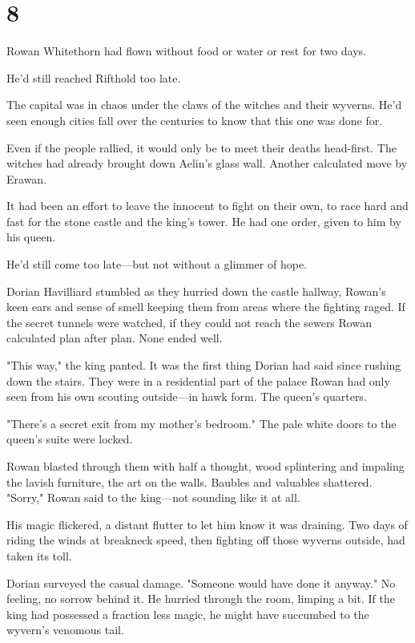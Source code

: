 
\chapter{8}

Rowan Whitethorn had flown without food or water or rest for two days.

He'd still reached Rifthold too late.

The capital was in chaos under the claws of the witches and their wyverns. He'd seen enough cities fall over the centuries to know that this one was done for.

Even if the people rallied, it would only be to meet their deaths head-first. The witches had already brought down Aelin's glass wall. Another calculated move by Erawan.

It had been an effort to leave the innocent to fight on their own, to race hard and fast for the stone castle and the king's tower. He had one order, given to him by his queen.

He'd still come too late---but not without a glimmer of hope.

Dorian Havilliard stumbled as they hurried down the castle hallway, Rowan's keen ears and sense of smell keeping them from areas where the fighting raged. If the secret tunnels were watched, if they could not reach the sewers  Rowan calculated plan after plan. None ended well.

"This way," the king panted. It was the first thing Dorian had said since rushing down the stairs. They were in a residential part of the palace Rowan had only seen from his own scouting outside---in hawk form. The queen's quarters.

"There's a secret exit from my mother's bedroom." The pale white doors to the queen's suite were locked.

Rowan blasted through them with half a thought, wood splintering and impaling the lavish furniture, the art on the walls. Baubles and valuables shattered. "Sorry," Rowan said to the king---not sounding like it at all.

His magic flickered, a distant flutter to let him know it was draining. Two days of riding the winds at breakneck speed, then fighting off those wyverns outside, had taken its toll.

Dorian surveyed the casual damage. "Someone would have done it anyway." No feeling, no sorrow behind it. He hurried through the room, limping a bit. If the king had possessed a fraction less magic, he might have succumbed to the wyvern's venomous tail.


